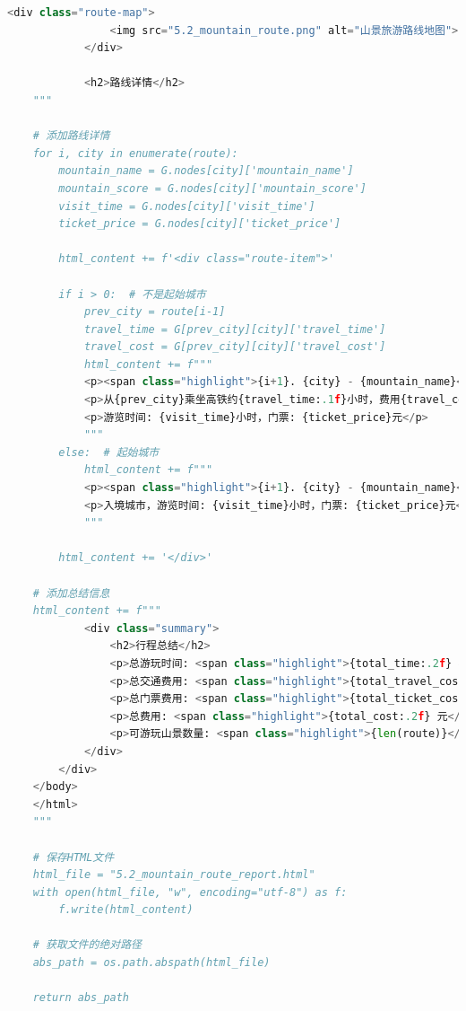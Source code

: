 \documentclass[withoutpreface,bwprint]{cumcmthesis} %
\begin{document}
\begin{appendices}
\begin{lstlisting}[language=python]
            <div class="route-map">
                <img src="5.2_mountain_route.png" alt="山景旅游路线地图">
            </div>
            
            <h2>路线详情</h2>
    """
    
    # 添加路线详情
    for i, city in enumerate(route):
        mountain_name = G.nodes[city]['mountain_name']
        mountain_score = G.nodes[city]['mountain_score']
        visit_time = G.nodes[city]['visit_time']
        ticket_price = G.nodes[city]['ticket_price']
        
        html_content += f'<div class="route-item">'
        
        if i > 0:  # 不是起始城市
            prev_city = route[i-1]
            travel_time = G[prev_city][city]['travel_time']
            travel_cost = G[prev_city][city]['travel_cost']
            html_content += f"""
            <p><span class="highlight">{i+1}. {city} - {mountain_name}</span> (评分: {mountain_score:.1f})</p>
            <p>从{prev_city}乘坐高铁约{travel_time:.1f}小时，费用{travel_cost:.0f}元</p>
            <p>游览时间: {visit_time}小时，门票: {ticket_price}元</p>
            """
        else:  # 起始城市
            html_content += f"""
            <p><span class="highlight">{i+1}. {city} - {mountain_name}</span> (评分: {mountain_score:.1f})</p>
            <p>入境城市，游览时间: {visit_time}小时，门票: {ticket_price}元</p>
            """
        
        html_content += '</div>'
    
    # 添加总结信息
    html_content += f"""
            <div class="summary">
                <h2>行程总结</h2>
                <p>总游玩时间: <span class="highlight">{total_time:.2f} 小时</span></p>
                <p>总交通费用: <span class="highlight">{total_travel_cost:.2f} 元</span></p>
                <p>总门票费用: <span class="highlight">{total_ticket_cost:.2f} 元</span></p>
                <p>总费用: <span class="highlight">{total_cost:.2f} 元</span></p>
                <p>可游玩山景数量: <span class="highlight">{len(route)}</span></p>
            </div>
        </div>
    </body>
    </html>
    """
    
    # 保存HTML文件
    html_file = "5.2_mountain_route_report.html"
    with open(html_file, "w", encoding="utf-8") as f:
        f.write(html_content)
    
    # 获取文件的绝对路径
    abs_path = os.path.abspath(html_file)
    
    return abs_path


\end{lstlisting}
\end{appendices}
\end{document}
